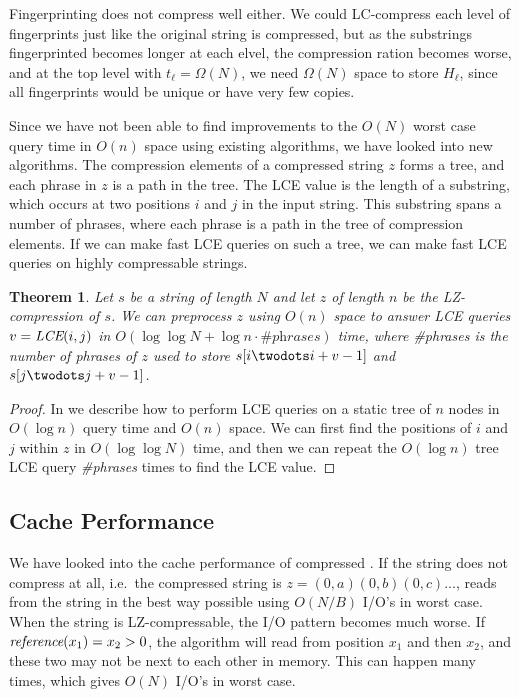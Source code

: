 \documentclass[a4]{article}
\newcommand*{\pref}{\prettyref}
\newtheorem{theorem}{Theorem}
\begin{document}
Fingerprinting does not compress well either. We could LC-compress each level of fingerprints just like the original string is compressed, but as the substrings fingerprinted becomes longer at each elvel, the compression ration becomes worse, and at the top level with $t_\ell = \Omega(N)$, we need $\Omega(N)$ space to store $H_\ell$, since all fingerprints would be unique or have very few copies.

Since we have not been able to find improvements to the $O(N)$ worst case query time in $O(n)$ space using existing algorithms, we have looked into new algorithms. The compression elements of a compressed string $z$ forms a tree, and each phrase in $z$ is a path in the tree. The LCE value is the length of a substring, which occurs at two positions $i$ and $j$ in the input string. This substring spans a number of phrases, where each phrase is a path in the tree of compression elements. If we can make fast LCE queries on such a tree, we can make fast LCE queries on highly compressable strings.

\begin{theorem}
\label{thm:lz-tree}
Let $s$ be a string of length $N$ and let $z$ of length $n$ be the LZ-compression of $s$. We can preprocess $z$ using $O(n)$ space to answer LCE queries $v=\textit{LCE}(i,j)$ in $O(\log\log N + \log n \cdot \textit{\#phrases})$ time, where \textit{\#phrases} is the number of phrases of $z$ used to store $s[i\twodots i+v-1]$ and $s[j\twodots j+v-1]$.
\end{theorem}

\begin{proof}
In \pref{sec:tree-lce} we describe how to perform LCE queries on a static tree of $n$ nodes in $O(\log n)$ query time and $O(n)$ space. We can first find the positions of $i$ and $j$ within $z$ in $O(\log\log N)$ time, and then we can repeat the $O(\log n)$ tree LCE query \textit{\#phrases} times to find the LCE value.
\end{proof}

\subsection{Cache Performance}

We have looked into the cache performance of compressed . If the string does not compress at all, i.e.\ the compressed string is $z=(0,a)(0,b)(0,c)...$,  reads from the string in the best way possible using $O(N/B)$ I/O's in worst case. When the string is LZ-compressable, the I/O pattern becomes much worse. If $\textit{reference}(x_1) = x_2 > 0$, the algorithm will read from position $x_1$ and then $x_2$, and these two may not be next to each other in memory. This can happen many times, which gives $O(N)$ I/O's in worst case.
\end{document}
